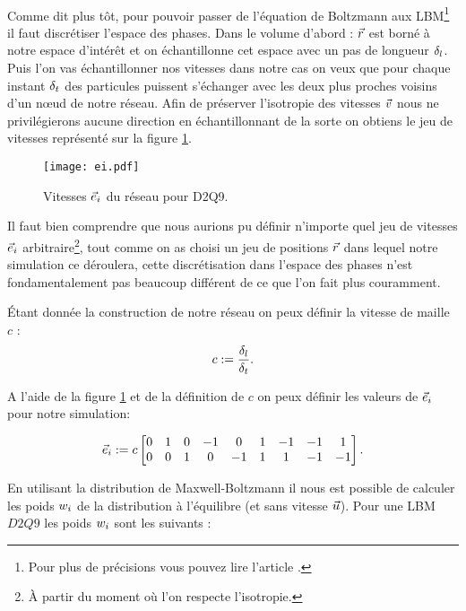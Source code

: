 \paragraph*{}
  Comme dit plus tôt, pour pouvoir passer de l'équation de Boltzmann aux LBM\footnote{Pour plus de précisions vous pouvez 
  lire l'article \cite{PhysRevE.56.6811}.} il faut discrétiser l'espace des phases.
  Dans le volume d'abord : $\vec{r}$ est borné à notre espace d'intérêt et on échantillonne cet espace avec un pas de longueur 
  $\delta_l$.
  Puis l'on vas échantillonner nos vitesses dans notre cas on veux que pour chaque instant $\delta_t$ des particules puissent 
  s'échanger avec les deux plus proches voisins d'un nœud de notre réseau.
  Afin de préserver l'isotropie des vitesses $\vec{v}$ nous ne privilégierons aucune direction en échantillonnant de la sorte
  on obtiens le jeu de vitesses représenté sur la figure \ref{fig:ei}.

  \begin{figure}[htp]
    \centering
    \texttt{[image: ei.pdf]}
    \caption{Vitesses $\vec{e}_i$ du réseau pour D2Q9.}
    \label{fig:ei}
  \end{figure}
  
  Il faut bien comprendre que nous aurions pu définir n'importe quel jeu de vitesses $\vec{e}_i$ arbitraire\footnote{À partir du   
  moment où l'on respecte l'isotropie.}, tout comme on as choisi un jeu de positions $\vec{r}$ dans lequel notre simulation ce 
  déroulera, cette discrétisation dans l'espace des phases n'est fondamentalement pas beaucoup différent de ce que l'on
  fait plus couramment.
  
  Étant donnée la construction de notre réseau on peux définir la vitesse de maille $c$ :
  \begin{equation} \label{eq:c}
    c := \frac{\delta_l}{\delta_t}.
  \end{equation}
  
  A l'aide de la figure \ref{fig:ei} et de la définition de $c$ on peux définir les valeurs de $\vec{e}_i$ pour notre 
  simulation:
  
  \begin{equation}
    \vec{e}_i := c
    \begin{bmatrix}
      0&1&0&-1&0&1&-1&-1&1\\
      0&0&1&0&-1&1&1&-1&-1
    \end{bmatrix}.
  \end{equation}

  En utilisant la distribution de Maxwell-Boltzmann il nous est possible de calculer les poids $w_i$ de la distribution à
  l'équilibre (et sans vitesse $\vec{u}$).
  Pour une LBM $D2Q9$ les poids $w_i$ sont les suivants :
  
